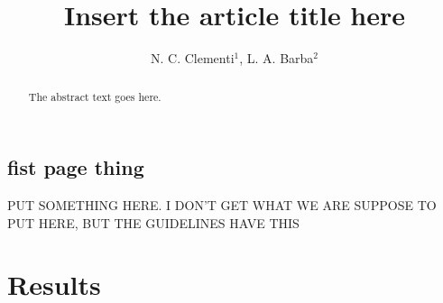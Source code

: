 \documentclass[openacc]{rstransa} %
\begin{document}
\title{Insert the article title here}

\author{%
N. C. Clementi$^{1}$, L. A. Barba$^{2}$}

\address{$^{1}$First author address\\
$^{2}$Second author address\\
$^{3}$Third author address}

\subject{xxxxx, xxxxx, xxxx}



\begin{abstract}
    The abstract text goes here. 
\end{abstract}
    
    
\begin{fmtext}  
\section{fist page thing}

PUT SOMETHING HERE. I DON'T GET WHAT WE ARE SUPPOSE TO PUT HERE, BUT THE GUIDELINES HAVE THIS

\end{fmtext}

\maketitle

\section{Results} \label{sec:results}


\newpage

\end{document}
